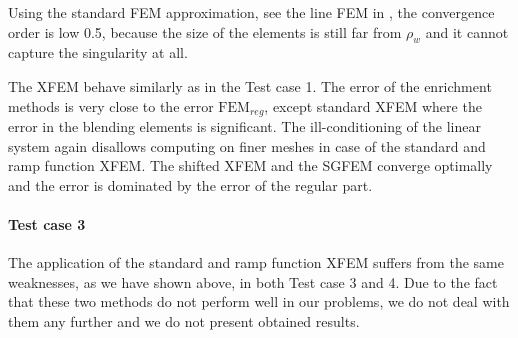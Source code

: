 Using the standard FEM approximation, see the line FEM in , the convergence order is low 0.5,
because the size of the elements is still far from $\rho_w$ and it cannot capture the singularity at all.

The XFEM behave similarly as in the Test case 1. The error of the enrichment methods is very close to the error $\textrm{FEM}_{reg}$,
except standard XFEM where the error in the blending elements is significant. The ill-conditioning of the linear system again 
disallows computing on finer meshes in case of the standard and ramp function XFEM.
The shifted XFEM and the SGFEM converge optimally and the error is dominated by the error of the regular part.


\paragraph{Test case 3}
The application of the standard and ramp function XFEM suffers from the same weaknesses, as we have shown above, in both Test case 3 and 4.
Due to the fact that these two methods do not perform well in our problems, we do not deal with them any further
and we do not present obtained results.

